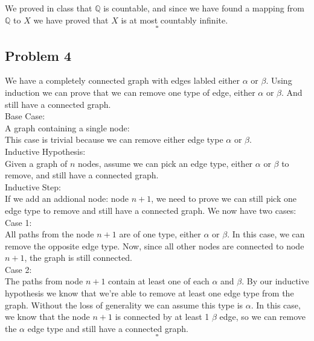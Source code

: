\documentclass{article}
\begin{document}
We proved in class that $\mathbb{Q}$ is countable, and since we have found a mapping from $\mathbb{Q}$ to $X$
we have proved that $X$ is at most countably infinite.
\[\square\]

\pagebreak
\subsection*{Problem 4}
We have a completely connected graph with edges labled either $\alpha$ or $\beta$. Using induction we can prove that
we can remove one type of edge, either $\alpha$ or $\beta$. And still have a connected graph.\\

Base Case:\\
A graph containing a single node:\\
This case is trivial because we can remove either edge type $\alpha$ or $\beta$.\\

Inductive Hypothesis:\\
Given a graph of $n$ nodes, assume we can pick an edge type, either $\alpha$ or $\beta$ to remove, and still have a
connected graph.\\

Inductive Step:\\
If we add an addional node: node $n+1$, we need to prove we can still pick one edge type to remove and still have a
connected graph. We now have two cases:\\

Case 1:\\
All paths from the node $n+1$ are of one type, either $\alpha$ or $\beta$. In this case, we can remove the opposite
edge type. Now, since all other nodes are connected to node $n+1$, the graph is still connected.\\

Case 2:\\
The paths from node $n+1$ contain at least one of each $\alpha$ and $\beta$. By our inductive hypothesis we know that
we're able to remove at least one edge type from the graph. Without the loss of generality we can assume this type is
$\alpha$. In this case, we know that the node $n+1$ is connected by at least 1 $\beta$ edge, so we can remove the
$\alpha$ edge type and still have a connected graph.
\[\square\]
\end{document}
